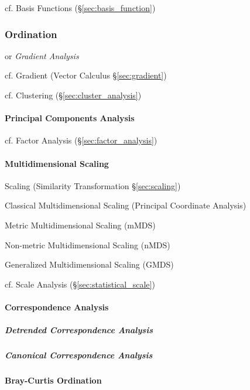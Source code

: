 cf. Basis Functions (\S\ref{sec:basis_function})



\subsubsection{Ordination}\label{sec:ordination}

or \emph{Gradient Analysis}

cf. Gradient (Vector Calculus \S\ref{sec:gradient})

cf. Clustering (\S\ref{sec:cluster_analysis})



\paragraph{Principal Components Analysis}\label{sec:pca}\hfill

cf. Factor Analysis (\S\ref{sec:factor_analysis})



\paragraph{Multidimensional Scaling}\label{sec:multidimensional_scaling}\hfill

\fist Scaling (Similarity Transformation \S\ref{sec:scaling})

Classical Multidimensional Scaling (Principal Coordinate Analysis)

Metric Multidimensional Scaling (mMDS)

Non-metric Multidimensional Scaling (nMDS)

Generalized Multidimensional Scaling (GMDS)

cf. Scale Analysis (\S\ref{sec:statistical_scale})



\paragraph{Correspondence Analysis}\label{sec:correspondence_analysis}\hfill

\subparagraph{Detrended Correspondence Analysis}
\label{sec:detrended_correspondence}\hfill

\subparagraph{Canonical Correspondence Analysis}
\label{sec:canonical_correspondence}\hfill



\paragraph{Bray-Curtis Ordination}\label{sec:bray_curtis_ordination}\hfill

